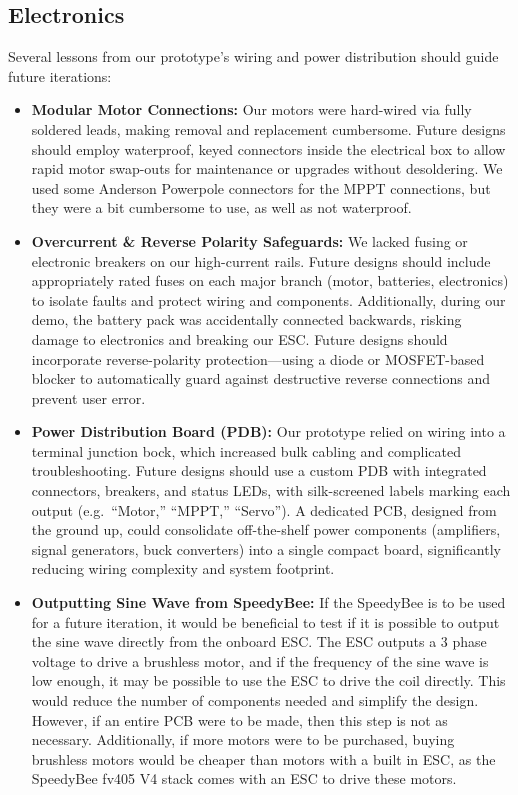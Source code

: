 \subsection{Electronics}

Several lessons from our prototype's wiring and power distribution should guide future iterations:
\begin{itemize}
  \item \textbf{Modular Motor Connections:} 
    Our motors were hard-wired via fully soldered leads, making removal and replacement cumbersome. Future designs should employ waterproof, keyed connectors inside the electrical box to allow rapid motor swap-outs for maintenance or upgrades without desoldering. We used some Anderson Powerpole connectors for the MPPT connections, but they were a bit cumbersome to use, as well as not waterproof. 
  \item \textbf{Overcurrent \& Reverse Polarity Safeguards:} 
    We lacked fusing or electronic breakers on our high-current rails. Future designs should include appropriately rated fuses on each major branch (motor, batteries, electronics) to isolate faults and protect wiring and components.
    Additionally, during our demo, the battery pack was accidentally connected backwards, risking damage to electronics and breaking our ESC. Future designs should incorporate reverse-polarity protection—using a diode or MOSFET-based blocker to automatically guard against destructive reverse connections and prevent user error.
  \item \textbf{Power Distribution Board (PDB):} 
    Our prototype relied on wiring into a terminal junction bock, which increased bulk cabling and complicated troubleshooting. Future designs should use a custom PDB with integrated connectors, breakers, and status LEDs, with silk-screened labels marking each output (e.g.\ “Motor,” “MPPT,” “Servo”). A dedicated PCB, designed from the ground up, could consolidate off-the-shelf power components (amplifiers, signal generators, buck converters) into a single compact board, significantly reducing wiring complexity and system footprint.
  \item \textbf{Outputting Sine Wave from SpeedyBee:}
    If the SpeedyBee is to be used for a future iteration, it would be beneficial to test if it is possible to output the sine wave directly from the onboard ESC. The ESC outputs a 3 phase voltage to drive a brushless motor, and if the frequency of the sine wave is low enough, it may be possible to use the ESC to drive the coil directly. This would reduce the number of components needed and simplify the design. However, if an entire PCB were to be made, then this step is not as necessary. Additionally, if more motors were to be purchased, buying brushless motors would be cheaper than motors with a built in ESC, as the SpeedyBee fv405 V4 stack comes with an ESC to drive these motors. 

\end{itemize}
